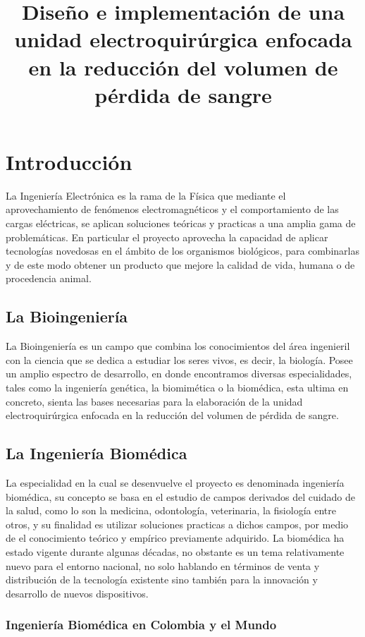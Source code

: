 \documentclass[12pt,letterpaper,spanish]{article}
\title{Diseño e implementación de una unidad electroquirúrgica 
enfocada en la reducción del volumen de pérdida de sangre}
\begin{document}
	\tableofcontents
	\newpage
	
	\section{Introducción}
	La Ingeniería Electrónica es la rama de la Física que mediante el aprovechamiento de fenómenos electromagnéticos y el comportamiento de las cargas eléctricas, se aplican soluciones teóricas y practicas a una amplia gama de problemáticas. En particular el proyecto aprovecha la capacidad de aplicar tecnologías novedosas en el ámbito de los organismos biológicos, para combinarlas y de este modo obtener un producto que mejore la calidad de vida, humana o de procedencia animal.       	
	
		\subsection{La Bioingeniería}
		La Bioingeniería es un campo que combina los conocimientos del área ingenieril con la ciencia que se dedica a estudiar los seres vivos, es decir, la biología. Posee un amplio espectro de desarrollo, en donde encontramos diversas especialidades, tales como la ingeniería genética, la biomimética o la biomédica, esta ultima en concreto, sienta las bases necesarias para la elaboración de la unidad electroquirúrgica 
enfocada en la reducción del volumen de pérdida de sangre.   		
			
		\subsection{La Ingeniería Biomédica}
		La especialidad en la cual se desenvuelve el proyecto es denominada ingeniería biomédica, su concepto se basa en el estudio de campos derivados del cuidado de la salud, como lo son la medicina, odontología, veterinaria, la fisiología entre otros, y su finalidad es utilizar soluciones practicas a
dichos campos, por medio de el conocimiento teórico y empírico previamente adquirido. La biomédica ha estado vigente durante algunas décadas, no obstante es un tema relativamente nuevo para el entorno nacional, no solo hablando en términos de venta y distribución de la tecnología existente sino también para la innovación y desarrollo de nuevos dispositivos.
		
			\subsubsection{Ingeniería Biomédica en Colombia y el Mundo}
						
\end{document}
